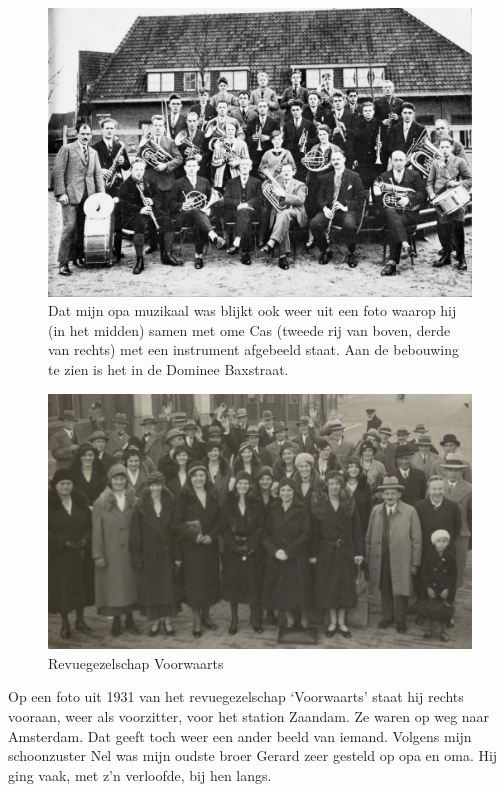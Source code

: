 \documentclass[12pt,twoside, openright]{memoir}
\begin{document}
\begin{figure}
\centering
\includegraphics[width=\textwidth]{img/ch2/ch2-afb04}
\caption*{\footnotesize Dat mijn opa muzikaal was blijkt ook weer uit een foto waarop hij (in het midden) samen met ome Cas (tweede rij van boven, derde van rechts) met een instrument afgebeeld staat. Aan de bebouwing te zien is het in de Dominee Baxstraat.}
\end{figure}

\begin{figure}
\includegraphics[width=\textwidth]{img/ch2/ch2-afb08}
\caption*{\footnotesize Revuegezelschap Voorwaarts}
\end{figure}

Op een foto uit 1931 van het revuegezelschap `Voorwaarts' staat hij rechts vooraan, weer als voorzitter, voor het station Zaandam. Ze waren op weg naar Amsterdam. Dat geeft toch weer een ander beeld van iemand. Volgens mijn schoonzuster Nel was mijn oudste broer Gerard zeer gesteld op opa en oma. Hij ging vaak, met z’n verloofde, bij hen langs. 
\end{document}
